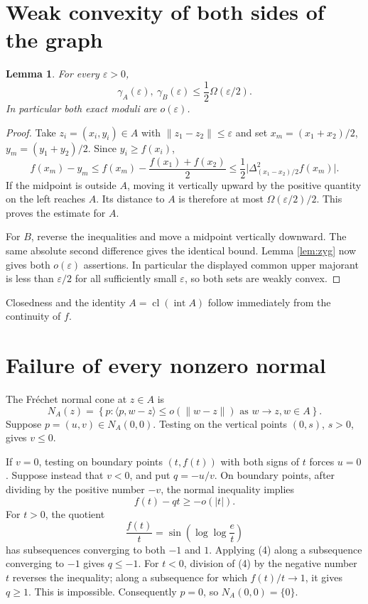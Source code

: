 \documentclass[11pt]{article}
\newtheorem{lemma}{Lemma}
\newcommand{\cl}{\operatorname{cl}}
\begin{document}
\section{Weak convexity of both sides of the graph}

\begin{lemma}\label{lem:graph}
For every $\varepsilon>0$,
\[
 \gamma_A(\varepsilon),\ \gamma_B(\varepsilon)
 \leq \frac12\Omega(\varepsilon/2).
\]
In particular both exact moduli are $o(\varepsilon)$.
\end{lemma}

\begin{proof}
Take $z_i=(x_i,y_i)\in A$ with $\|z_1-z_2\|\leq\varepsilon$ and set
$x_m=(x_1+x_2)/2$, $y_m=(y_1+y_2)/2$.  Since $y_i\geq f(x_i)$,
\[
 f(x_m)-y_m
 \leq f(x_m)-\frac{f(x_1)+f(x_2)}2
 \leq\frac12\big|\Delta_{(x_1-x_2)/2}^2f(x_m)\big|.
\]
If the midpoint is outside $A$, moving it vertically upward by the positive
quantity on the left reaches $A$.  Its distance to $A$ is therefore at most
$\Omega(\varepsilon/2)/2$.  This proves the estimate for $A$.

For $B$, reverse the inequalities and move a midpoint vertically downward.
The same absolute second difference gives the identical bound.  Lemma
\ref{lem:zyg} now gives both $o(\varepsilon)$ assertions.  In particular
the displayed common upper majorant is less than $\varepsilon/2$ for all
sufficiently small $\varepsilon$, so both sets are weakly convex.
\end{proof}

Closedness and the identity $A=\cl(\operatorname{int}A)$ follow immediately
from the continuity of $f$.

\section{Failure of every nonzero normal}

The Fr\'echet normal cone at $z\in A$ is
\[
 N_A(z)=\left\{p:
 \langle p,w-z\rangle\leq o(\|w-z\|)
 \text{ as }w\to z, w\in A\right\}.
\]
Suppose $p=(u,v)\in N_A(0,0)$.  Testing on the vertical points $(0,s)$,
$s>0$, gives $v\leq0$.

If $v=0$, testing on boundary points $(t,f(t))$ with both signs of $t$
forces $u=0$.  Suppose instead that $v<0$, and put $q=-u/v$.  On boundary
points, after dividing by the positive number $-v$, the normal inequality
implies
\[
 f(t)-qt\geq-o(|t|).                                             \tag{4}
\]
For $t>0$, the quotient
\[
 \frac{f(t)}t=\sin\!\left(\log\log\frac e t\right)
\]
has subsequences converging to both $-1$ and $1$.  Applying (4) along a
subsequence converging to $-1$ gives $q\leq-1$.  For $t<0$, division of
(4) by the negative number $t$ reverses the inequality; along a subsequence
for which $f(t)/t\to1$, it gives $q\geq1$.  This is impossible.
Consequently $p=0$, so $N_A(0,0)=\{0\}$.
\end{document}
